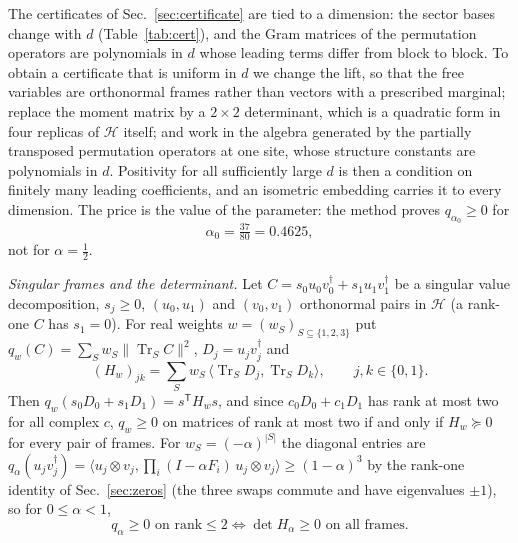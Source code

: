 \documentclass[aps,pra,twocolumn,superscriptaddress,nofootinbib,longbibliography]{revtex4-2}
\newcommand{\Hh}{\mathcal H}
\newcommand{\ip}[2]{\langle #1,#2\rangle}
\DeclareMathOperator{\Tr}{Tr}
\newcommand{\T}{\mathsf T}
\theoremstyle{plain}
\theoremstyle{definition}
\theoremstyle{remark}
\begin{document}
The certificates of Sec.~\ref{sec:certificate} are tied to a dimension: the sector bases change with $d$ (Table~\ref{tab:cert}), and the Gram matrices of the permutation operators are polynomials in $d$ whose leading terms differ from block to block. To obtain a certificate that is uniform in $d$ we change the lift, so that the free variables are orthonormal frames rather than vectors with a prescribed marginal; replace the moment matrix by a $2\times2$ determinant, which is a quadratic form in four replicas of $\Hh$ itself; and work in the algebra generated by the partially transposed permutation operators at one site, whose structure constants are polynomials in $d$. Positivity for all sufficiently large $d$ is then a condition on finitely many leading coefficients, and an isometric embedding carries it to every dimension. The price is the value of the parameter: the method proves $q_{\alpha_0}\ge0$ for
\begin{equation}\label{eq:alpha0}
\alpha_0=\tfrac{37}{80}=0.4625,
\end{equation}
not for $\alpha=\tfrac12$.

\emph{Singular frames and the determinant.} Let $C=s_0u_0v_0^\dagger+s_1u_1v_1^\dagger$ be a singular value decomposition, $s_j\ge0$, $(u_0,u_1)$ and $(v_0,v_1)$ orthonormal pairs in $\Hh$ (a rank-one $C$ has $s_1=0$). For real weights $w=(w_S)_{S\subseteq\{1,2,3\}}$ put $q_w(C)=\sum_Sw_S\|\Tr_SC\|^2$, $D_j=u_jv_j^\dagger$ and
\begin{equation}\label{eq:H}
(H_w)_{jk}=\sum_Sw_S\,\ip{\Tr_SD_j}{\Tr_SD_k},\qquad j,k\in\{0,1\}.
\end{equation}
Then $q_w(s_0D_0+s_1D_1)=s^\T H_ws$, and since $c_0D_0+c_1D_1$ has rank at most two for all complex $c$, $q_w\ge0$ on matrices of rank at most two if and only if $H_w\succeq0$ for every pair of frames. For $w_S=(-\alpha)^{|S|}$ the diagonal entries are $q_\alpha(u_jv_j^\dagger)=\ip{u_j\otimes v_j}{\prod_i(I-\alpha F_i)\,u_j\otimes v_j}\ge(1-\alpha)^3$ by the rank-one identity of Sec.~\ref{sec:zeros} (the three swaps commute and have eigenvalues $\pm1$), so for $0\le\alpha<1$,
\begin{equation}\label{eq:detcrit}
q_\alpha\ge0\text{ on rank}\le2\iff\det H_\alpha\ge0\text{ on all frames.}
\end{equation}
\end{document}
